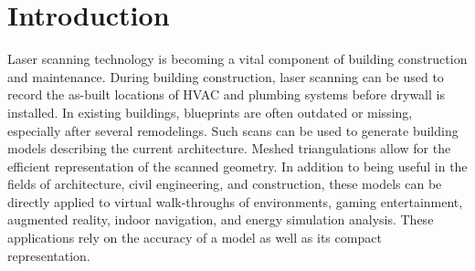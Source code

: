 \documentclass[12pt,onecolumn,oneside]{book}
\begin{document}

\newpage
{}
\setcounter{page}{1}

\chapter{Introduction}
\label{ch:introduction}

Laser scanning technology is becoming a vital component of building construction and maintenance.  During building construction, laser scanning can be used to record the as-built locations of HVAC and plumbing systems before drywall is installed.  In existing buildings, blueprints are often outdated or missing, especially after several remodelings.  Such scans can be used to generate building models describing the current architecture.  Meshed triangulations allow for the efficient representation of the scanned geometry.  In addition to being useful in the fields of architecture, civil engineering, and construction, these models can be directly applied to virtual walk-throughs of environments, gaming entertainment, augmented reality, indoor navigation, and energy simulation analysis.  These applications rely on the accuracy of a model as well as its compact representation.
\end{document}
